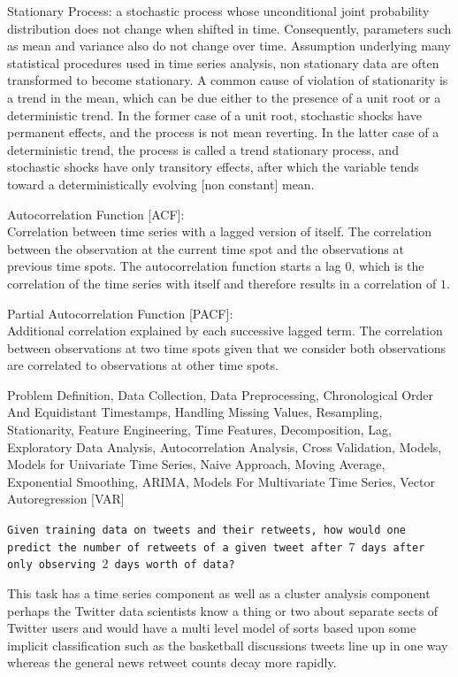 Stationary Process: a stochastic process whose unconditional joint probability distribution does not change when shifted in time. Consequently, parameters such as mean and variance also do not change over time. Assumption underlying many statistical procedures used in time series analysis, non stationary data are often transformed to become stationary. A common cause of violation of stationarity is a trend in the mean, which can be due either to the presence of a unit root or a deterministic trend. In the former case of a unit root, stochastic shocks have permanent effects, and the process is not mean reverting. In the latter case of a deterministic trend, the process is called a trend stationary process, and stochastic shocks have only transitory effects, after which the variable tends toward a deterministically evolving [non constant] mean.

Autocorrelation Function [ACF]: \\
Correlation between time series with a lagged version of itself. The correlation between the observation at the current time spot and the observations at previous time spots. The autocorrelation function starts a lag $0$, which is the correlation of the time series with itself and therefore results in a correlation of $1$.

Partial Autocorrelation Function [PACF]: \\
Additional correlation explained by each successive lagged term. The correlation between observations at two time spots given that we consider both observations are correlated to observations at other time spots.

Problem Definition, Data Collection, Data Preprocessing, Chronological Order And Equidistant Timestamps, Handling Missing Values, Resampling, Stationarity, Feature Engineering, Time Features, Decomposition, Lag, Exploratory Data Analysis, Autocorrelation Analysis, Cross Validation, Models, Models for Univariate Time Series, Naive Approach, Moving Average, Exponential Smoothing, ARIMA, Models For Multivariate Time Series, Vector Autoregression [VAR]

\texttt{Given training data on tweets and their retweets, how would one predict the number of retweets of a given tweet after $7$ days after only observing $2$ days worth of data?}

This task has a time series component as well as a cluster analysis component perhaps the Twitter data scientists know a thing or two about separate sects of Twitter users and would have a multi level model of sorts based upon some implicit classification such as the basketball discussions tweets line up in one way whereas the general news retweet counts decay more rapidly.

